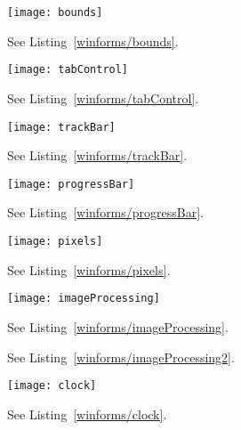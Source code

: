 %
%
\begin{figure}
  \centering
  \texttt{[image: bounds]}
  \caption{See Listing~\ref{winforms/bounds}.}
  \label{fig:bounds}
\end{figure}

%
%
\begin{figure}
  \centering
  \texttt{[image: tabControl]}
  \caption{See Listing~\ref{winforms/tabControl}.}
  \label{fig: tabControl}
\end{figure}

%
%
\begin{figure}
  \centering
  \texttt{[image: trackBar]}
  \caption{See Listing~\ref{winforms/trackBar}.}
  \label{fig: trackBar}
\end{figure}

%
%
\begin{figure}
  \centering
  \texttt{[image: progressBar]}
  \caption{See Listing~\ref{winforms/progressBar}.}
  \label{fig:bounds}
\end{figure}

%
%
\begin{figure}
  \centering
  \texttt{[image: pixels]}
  \caption{See Listing~\ref{winforms/pixels}.}
  \label{fig:pixels}
\end{figure}

%
%
\begin{figure}
  \centering
  \texttt{[image: imageProcessing]}
  \caption{See Listing~\ref{winforms/imageProcessing}.}
  \label{fig:imageProcessing}
\end{figure}
%
%
\begin{figure}
  \centering
  \caption{See Listing~\ref{winforms/imageProcessing2}.}
  \label{fig:imageProcessing2}
\end{figure}

%
%
\begin{figure}
  \centering
  \texttt{[image: clock]}
  \caption{See Listing~\ref{winforms/clock}.}
  \label{fig:clock}
\end{figure}
